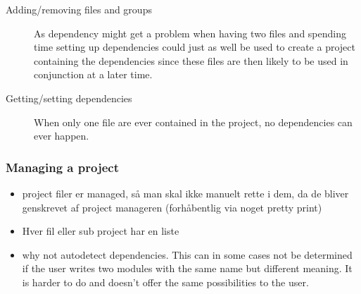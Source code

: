 \begin{description}
\item[Adding/removing files and groups] As dependency might get a problem when
  having two files and spending time setting up dependencies could just as well
  be used to create a project containing the dependencies since these files are
  then likely to be used in conjunction at a later time.
  
  
\item[Getting/setting dependencies] When only one file are ever contained in the
  project, no dependencies can ever happen.
\end{description}


\subsubsection{Managing a project}


\begin{itemize}
\item project filer er managed, så man skal ikke manuelt rette i dem, da de
  bliver genskrevet af project manageren (forhåbentlig via noget pretty print)

\item Hver fil eller sub project har en liste 

\item why not autodetect dependencies. This can in some cases not be determined
  if the user writes two modules with the same name but different meaning. It is
  harder to do and doesn't offer the same possibilities to the user.
\end{itemize}

